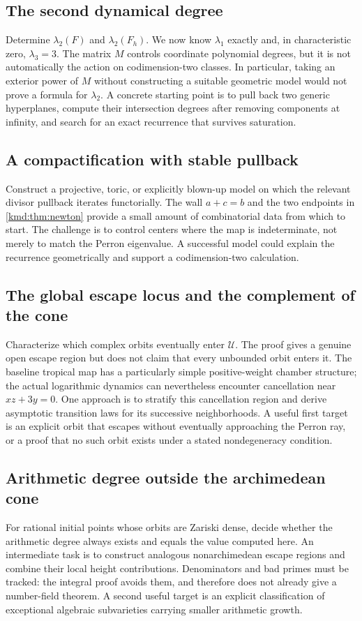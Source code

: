 \documentclass[11pt,a4paper]{article}
\numberwithin{equation}{section}
\theoremstyle{definition}
\theoremstyle{remark}
\newcommand{\calU}{\mathcal U}
\begin{document}
\subsection{The second dynamical degree}
Determine $\lambda_2(F)$ and $\lambda_2(F_h)$. We now know
$\lambda_1$ exactly and, in characteristic zero, $\lambda_3=3$.
The matrix $M$ controls coordinate polynomial degrees, but it is
not automatically the action on codimension-two classes. In
particular, taking an exterior power of $M$ without constructing
a suitable geometric model would not prove a formula for
$\lambda_2$. A concrete starting point is to pull back two generic
hyperplanes, compute their intersection degrees after removing
components at infinity, and search for an exact recurrence that
survives saturation.

\subsection{A compactification with stable pullback}
Construct a projective, toric, or explicitly blown-up model on
which the relevant divisor pullback iterates functorially. The
wall $a+c=b$ and the two endpoints in \cref{kmd:thm:newton} provide a
small amount of combinatorial data from which to start. The
challenge is to control centers where the map is indeterminate,
not merely to match the Perron eigenvalue. A successful model
could explain the recurrence geometrically and support a
codimension-two calculation.

\subsection{The global escape locus and the complement of the cone}
Characterize which complex orbits eventually enter $\calU$.
The proof gives a genuine open escape region but does not claim
that every unbounded orbit enters it. The baseline tropical map
has a particularly simple positive-weight chamber structure; the
actual logarithmic dynamics can nevertheless encounter
cancellation near $xz+3y=0$. One approach is to stratify this
cancellation region and derive asymptotic transition laws for its
successive neighborhoods. A useful first target is an explicit
orbit that escapes without eventually approaching the Perron ray,
or a proof that no such orbit exists under a stated nondegeneracy
condition.

\subsection{Arithmetic degree outside the archimedean cone}
For rational initial points whose orbits are Zariski dense, decide
whether the arithmetic degree always exists and equals the value
computed here. An intermediate task is to construct analogous
nonarchimedean escape regions and combine their local height
contributions. Denominators and bad primes must be tracked: the
integral proof avoids them, and therefore does not already give a
number-field theorem. A second useful target is an explicit
classification of exceptional algebraic subvarieties carrying
smaller arithmetic growth.
\end{document}
